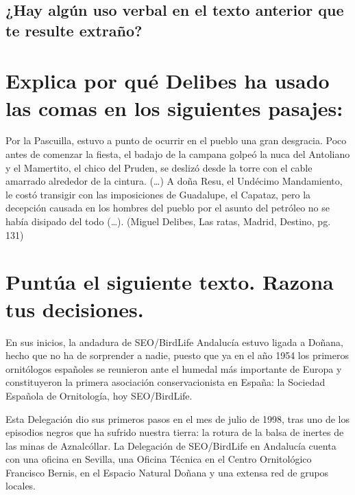 \documentclass[12pt, a4paper, oneside]{report}
\begin{document}
\subsection*{¿Hay algún uso verbal en el texto anterior que te resulte extraño?}


\section{Explica por qué Delibes ha usado las comas en los siguientes pasajes:}

Por la Pascuilla, estuvo a punto de ocurrir en el pueblo
una gran desgracia. Poco antes de comenzar la ﬁesta, el
badajo de la campana golpeó la nuca del Antoliano y el
Mamertito, el chico del Pruden, se deslizó desde la torre con el
cable amarrado alrededor de la cintura.
(…)
A doña Resu, el Undécimo Mandamiento, le costó
transigir con las imposiciones de Guadalupe, el Capataz, pero
la decepción causada en los hombres del pueblo por el asunto
del petróleo no se había disipado del todo (…).
(Miguel Delibes, Las ratas, Madrid, Destino, pg. 131)


\section{Puntúa el siguiente texto. Razona tus decisiones.}
En sus inicios, la andadura de SEO/BirdLife Andalucía estuvo ligada a Doñana, hecho que no ha de sorprender a
nadie, puesto que ya en el año 1954 los primeros ornitólogos españoles se reunieron ante el humedal más importante
de Europa y constituyeron la primera asociación conservacionista en España: la Sociedad Española de Ornitología, hoy
SEO/BirdLife.

Esta Delegación dio sus primeros pasos en el mes de julio de 1998, tras uno de los episodios negros que ha sufrido nuestra
tierra: la rotura de la balsa de inertes de las minas de Aznalcóllar. La Delegación de SEO/BirdLife en Andalucía cuenta con una
oﬁcina en Sevilla, una Oﬁcina Técnica en el Centro Ornitológico Francisco Bernis, en el Espacio Natural Doñana y una extensa red
de grupos locales.
\end{document}
